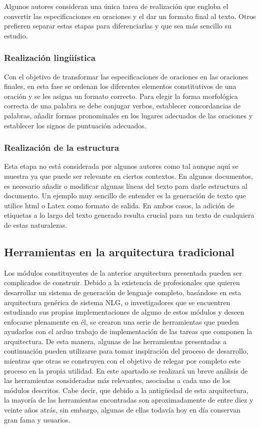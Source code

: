 Algunos autores consideran una única tarea de realización que engloba el convertir las especificaciones en oraciones y el dar un formato final al texto. Otros prefieren separar estas etapas para diferenciarlas y que sea más sencillo su estudio.

\subsubsection{Realización lingüística}
Con el objetivo de transformar las especificaciones de oraciones en las oraciones finales, en esta fase se ordenan los diferentes elementos constitutivos de una oración y se les asigna un formato correcto. Para elegir la forma morfológica correcta de una palabra se debe conjugar verbos, establecer concordancias de palabras, añadir formas pronominales en los lugares adecuados de las oraciones y establecer los signos de puntuación adecuados. 

\subsubsection{Realización de la estructura}
Esta etapa no está considerada por algunos autores como tal aunque aquí se muestra ya que puede ser relevante en ciertos contextos. 
En algunos documentos, es necesario añadir o modificar algunas líneas del texto para darle estructura al documento. Un ejemplo muy sencillo de entender es la generación de texto que utilice html o Latex como formato de salida. En ambos casos, la adición de etiquetas a lo largo del texto generado resulta crucial para un texto de cualquiera de estas naturalezas.

\subsection{Herramientas en la arquitectura tradicional}
Los módulos constituyentes de la anterior arquitectura presentada pueden ser complicados de construir. Debido a la existencia  de profesionales que quieren desarrollar un sistema de generación de lenguaje completo, basándose en esta arquitectura genérica de sistema NLG, o investigadores que se encuentren estudiando sus propias implementaciones de alguno de estos módulos y deseen enfocarse plenamente en él, se crearon una serie de herramientas que pueden ayudarlos con el arduo trabajo de implementación de las tareas que componen la arquitectura. De esta manera, algunas de las herramientas presentadas a continuación pueden utilizarse para tomar inspiración del proceso de desarrollo, mientras que otras se construyen con el objetivo de relegar por completo este proceso en la propia utilidad. En este apartado se realizará un breve análisis de las herramientas consideradas más relevantes, asociadas a cada uno de los módulos descritos. Cabe decir, que debido a la antigüedad de esta arquitectura, la mayoría de las herramientas encontradas son aproximadamente de entre diez y veinte años atrás, sin embargo, algunas de ellas todavía hoy en día conservan gran fama y usuarios.


